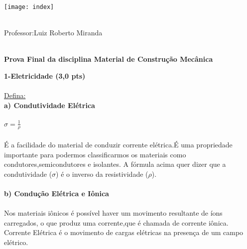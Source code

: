 \documentclass[11pt,a4paper]{article}
\begin{document}
\texttt{[image: index]}\\
\\
Professor:Luiz Roberto Miranda \\\\
\begin{center}
\textbf{Prova Final da disciplina Material de Construção Mecânica}
\end{center}
\textbf{1-Eletricidade (3,0 pts)}\\\\
\underline{Defina:}\\
\textbf{a) Condutividade Elétrica}\\\\
$\sigma=\frac{1}{\rho}$\\\\
É a facilidade do material de conduzir corrente elétrica.É uma propriedade importante para podermos classificarmos os materiais como condutores,semicondutores e isolantes. A fórmula acima quer dizer que a condutividade ($\sigma$) é o inverso da resistividade ($\rho$).
\\\\
\textbf{b) Condução Elétrica e Iônica}\\\\
Nos materiais iônicos é possível haver um movimento resultante de íons carregados, o que produz uma corrente,que é chamada de corrente iônica.\\Corrente Elétrica é o movimento de cargas elétricas na presença de um campo elétrico.\\\\
\end{document}
